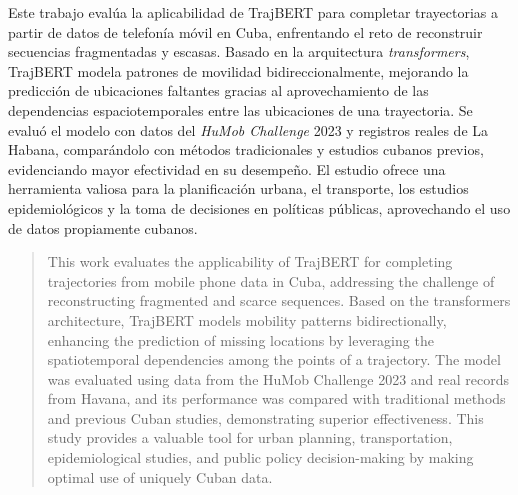 \begin{resumen}

	Este trabajo evalúa la aplicabilidad de TrajBERT para completar trayectorias a partir de datos de telefonía móvil en Cuba, enfrentando el reto de reconstruir secuencias fragmentadas y escasas. Basado en la arquitectura \textit{transformers}, TrajBERT modela patrones de movilidad bidireccionalmente, mejorando la predicción de ubicaciones faltantes gracias al aprovechamiento de las dependencias espaciotemporales entre las ubicaciones de una trayectoria. Se evaluó el modelo con datos del \textit{HuMob Challenge} 2023 y registros reales de La Habana, comparándolo con métodos tradicionales y estudios cubanos previos, evidenciando mayor efectividad en su desempeño. El estudio ofrece una herramienta valiosa para la planificación urbana, el transporte, los estudios epidemiológicos y la toma de decisiones en políticas públicas, aprovechando el uso de datos propiamente cubanos.
	
	\end{resumen}
	
	\begin{abstract}
	
	This work evaluates the applicability of TrajBERT for completing trajectories from mobile phone data in Cuba, addressing the challenge of reconstructing fragmented and scarce sequences. Based on the transformers architecture, TrajBERT models mobility patterns bidirectionally, enhancing the prediction of missing locations by leveraging the spatiotemporal dependencies among the points of a trajectory. The model was evaluated using data from the HuMob Challenge 2023 and real records from Havana, and its performance was compared with traditional methods and previous Cuban studies, demonstrating superior effectiveness. This study provides a valuable tool for urban planning, transportation, epidemiological studies, and public policy decision-making by making optimal use of uniquely Cuban data.
	
\end{abstract}